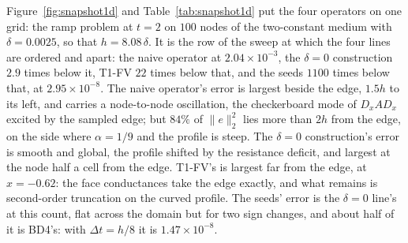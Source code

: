 \documentclass[11pt]{amsart}
\theoremstyle{definition}
\theoremstyle{remark}
\newcommand{\sci}[2]{#1 \times 10^{#2}}
\begin{document}
\begin{table}
  \centering
  \caption{The snapshot of Figure~\ref{fig:snapshot1d}: $\|e\|_2 / \|u\|_2$
  at the nodes, the largest nodal error and where it lies, and the share of
  $\|e\|_2^2$ from the nodes within $2h$ of the edge.}
  \label{tab:snapshot1d}
  \footnotesize
  
\end{table}

Figure~\ref{fig:snapshot1d} and Table~\ref{tab:snapshot1d} put the four
operators on one grid: the ramp problem at $t = 2$ on $100$ nodes of the
two-constant medium with $\delta = 0.0025$, so that $h = 8.08\,\delta$. It
is the row of the sweep at which the four lines are ordered and apart: the
naive operator at $\sci{2.04}{-3}$, the $\delta = 0$ construction $2.9$ times below it,
T1-FV $22$ times below that, and the seeds $1100$ times below that, at
$\sci{2.95}{-8}$. The naive operator's error is largest beside the edge,
$1.5h$ to its left, and carries a node-to-node oscillation, the
checkerboard mode of $D_x A D_x$ excited by the sampled edge; but $84\%$ of
$\|e\|_2^2$ lies more than $2h$ from the edge, on the side where
$\alpha = 1/9$ and the profile is steep. The $\delta = 0$ construction's error is smooth
and global, the profile shifted by the resistance deficit, and largest at
the node half a cell from the edge. T1-FV's is largest far from the edge,
at $x = -0.62$: the face conductances take the edge exactly, and what
remains is second-order truncation on the curved profile. The seeds' error
is the $\delta = 0$ line's at this count, flat across the domain but for
two sign changes, and about half of it is BD4's: with $\Delta t = h/8$ it
is $\sci{1.47}{-8}$.

\end{document}
